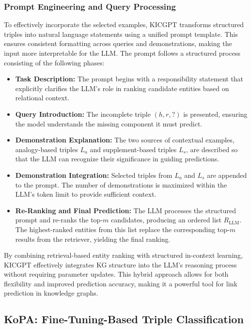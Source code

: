 \documentclass[12pt,a4paper]{article}
\begin{document}
\subsubsection{Prompt Engineering and Query Processing}

To effectively incorporate the selected examples, KICGPT transforms structured triples into natural language statements using a unified prompt template. This ensures consistent formatting across queries and demonstrations, making the input more interpretable for the LLM. The prompt follows a structured process consisting of the following phases:

\begin{itemize}
    \item \textbf{Task Description:} The prompt begins with a responsibility statement that explicitly clarifies the LLM’s role in ranking candidate entities based on relational context.
    \item \textbf{Query Introduction:} The incomplete triple \( (h, r, ?) \) is presented, ensuring the model understands the missing component it must predict.
    \item \textbf{Demonstration Explanation:} The two sources of contextual examples, analogy-based triples \( L_a \) and supplement-based triples \( L_s \), are described so that the LLM can recognize their significance in guiding predictions.
    \item \textbf{Demonstration Integration:} Selected triples from \( L_a \) and \( L_s \) are appended to the prompt. The number of demonstrations is maximized within the LLM’s token limit to provide sufficient context.
    \item \textbf{Re-Ranking and Final Prediction:} The LLM processes the structured prompt and re-ranks the top-\( m \) candidates, producing an ordered list \( R_{\text{LLM}} \). The highest-ranked entities from this list replace the corresponding top-\( m \) results from the retriever, yielding the final ranking.
\end{itemize}

By combining retrieval-based entity ranking with structured in-context learning, KICGPT effectively integrates KG structure into the LLM’s reasoning process without requiring parameter updates. This hybrid approach allows for both flexibility and improved prediction accuracy, making it a powerful tool for link prediction in knowledge graphs.


\subsection{KoPA: Fine-Tuning-Based Triple Classification}
\end{document}
